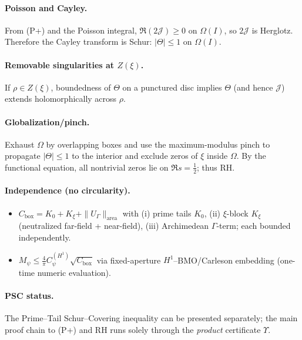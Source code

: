\paragraph{Poisson and Cayley.} From (P+) and the Poisson integral, $\Re(2\mathcal J)\ge 0$ on $\Omega(I)$, so $2\mathcal J$ is Herglotz. Therefore the Cayley transform is Schur: $|\Theta|\le1$ on $\Omega(I)$.

\paragraph{Removable singularities at $Z(\xi)$.} If $\rho\in Z(\xi)$, boundedness of $\Theta$ on a punctured disc implies $\Theta$ (and hence $\mathcal J$) extends holomorphically across $\rho$.

\paragraph{Globalization/pinch.} Exhaust $\Omega$ by overlapping boxes and use the maximum-modulus pinch to propagate $|\Theta|\le1$ to the interior and exclude zeros of $\xi$ inside $\Omega$. By the functional equation, all nontrivial zeros lie on $\Re s=\tfrac12$; thus RH.

\paragraph{Independence (no circularity).}
\begin{itemize}
  \item $C_{\mathrm{box}}=K_0+K_\xi+\|U_\Gamma\|_{\mathrm{area}}$ with (i) prime tails $K_0$, (ii) $\xi$-block $K_\xi$ (neutralized far-field + near-field), (iii) Archimedean $\Gamma$-term; each bounded independently.
  \item $M_\psi\le \tfrac{4}{\pi}C_\psi^{(H^1)}\sqrt{C_{\mathrm{box}}}$ via fixed-aperture $H^1$–BMO/Carleson embedding (one-time numeric evaluation).
\end{itemize}

\paragraph{PSC status.} The Prime–Tail Schur–Covering inequality can be presented separately; the main proof chain to (P+) and RH runs solely through the \emph{product} certificate $\Upsilon$.
